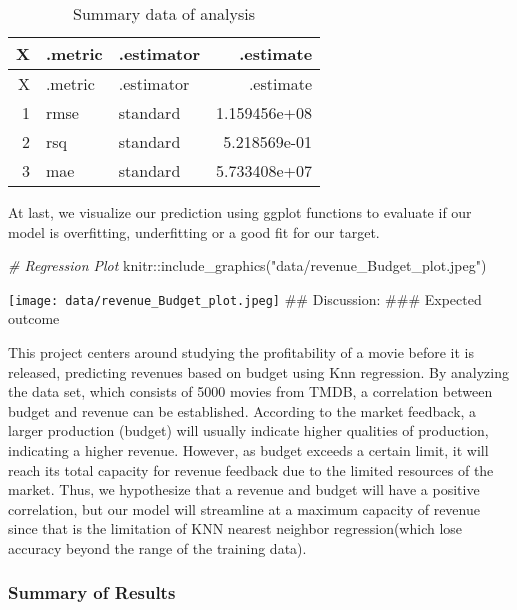 \documentclass[
]{article}
\newenvironment{Shaded}{\begin{snugshade}}{\end{snugshade}}
\newcommand{\CommentTok}[1]{\textcolor[rgb]{0.56,0.35,0.01}{\textit{#1}}}
\newcommand{\FunctionTok}[1]{\textcolor[rgb]{0.00,0.00,0.00}{#1}}
\newcommand{\NormalTok}[1]{#1}
\newcommand{\SpecialCharTok}[1]{\textcolor[rgb]{0.00,0.00,0.00}{#1}}
\newcommand{\StringTok}[1]{\textcolor[rgb]{0.31,0.60,0.02}{#1}}
\begin{document}
\begin{longtable}[]{@{}rllr@{}}
\caption{Summary data of analysis}\tabularnewline
\toprule()
X & .metric & .estimator & .estimate \\
\midrule()
\endfirsthead
\toprule()
X & .metric & .estimator & .estimate \\
\midrule()
\endhead
1 & rmse & standard & 1.159456e+08 \\
2 & rsq & standard & 5.218569e-01 \\
3 & mae & standard & 5.733408e+07 \\
\bottomrule()
\end{longtable}

At last, we visualize our prediction using ggplot functions to evaluate
if our model is overfitting, underfitting or a good fit for our target.

\begin{Shaded}
\begin{Highlighting}[]
\CommentTok{\# Regression Plot}
\NormalTok{knitr}\SpecialCharTok{::}\FunctionTok{include\_graphics}\NormalTok{(}\StringTok{"data/revenue\_Budget\_plot.jpeg"}\NormalTok{)}
\end{Highlighting}
\end{Shaded}

\texttt{[image: data/revenue\_Budget\_plot.jpeg]} \#\# Discussion: \#\#\#
Expected outcome

This project centers around studying the profitability of a movie before
it is released, predicting revenues based on budget using Knn
regression. By analyzing the data set, which consists of 5000 movies
from TMDB, a correlation between budget and revenue can be established.
According to the market feedback, a larger production (budget) will
usually indicate higher qualities of production, indicating a higher
revenue. However, as budget exceeds a certain limit, it will reach its
total capacity for revenue feedback due to the limited resources of the
market. Thus, we hypothesize that a revenue and budget will have a
positive correlation, but our model will streamline at a maximum
capacity of revenue since that is the limitation of KNN nearest neighbor
regression(which lose accuracy beyond the range of the training data).

\hypertarget{summary-of-results}{%
\subsubsection{Summary of Results}\label{summary-of-results}}
\end{document}
